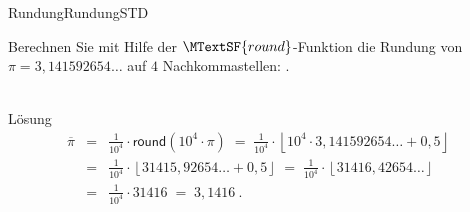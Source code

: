 \begin{MXContent}{Rundung}{Rundung}{STD}
\begin{MExercise}
Berechnen Sie mit Hilfe der $\MTextSF{round}$-Funktion die Rundung von $\pi=3,141592654\ldots$ auf $4$ Nachkommastellen:
.
\ \\ \ \\
\begin{MHint}{Lösung}
\begin{eqnarray*}
\overline{\pi} & = & \frac{1}{10^{4}}\cdot \mathsf{round}(10^{4}\cdot \pi)\; =\; \frac{1}{10^{4}}\cdot \left\lfloor{ 10^{4}\cdot 3,141592654\ldots + 0,5 }\right\rfloor \ \\
& = & \frac{1}{10^{4}}\cdot \left\lfloor{ 31415,92654\ldots+0,5}\right\rfloor \;=\; \frac{1}{10^{4}}\cdot \left\lfloor{ 31416,42654\ldots }\right\rfloor\ \\
& = & \frac{1}{10^{4}}\cdot 31416\; =\;  3,1416\: .
\end{eqnarray*}
\end{MHint}
\end{MExercise}


\end{MXContent}
